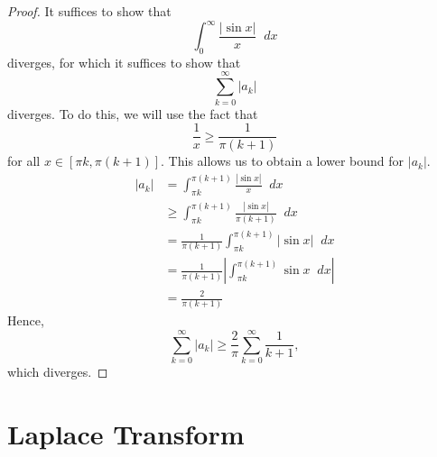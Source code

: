 \documentclass[a4paper]{article}
\newcommand*\diff{\mathop{}\!d} %
\theoremstyle{definition}
\begin{document}
\begin{proof}
    It suffices to show that
    \begin{equation*}
        \int_{0}^{\infty} \frac{|\sin x|}{x} \diff x
    \end{equation*}
    diverges, for which it suffices to show that
    \begin{equation*}
        \sum_{k=0}^{\infty} |a_k|
    \end{equation*}
    diverges.
    To do this, we will use the fact that
    \begin{equation*}
        \frac{1}{x} \geq \frac{1}{\pi(k+1)}
    \end{equation*}
    for all $x \in [\pi k, \pi(k+1)]$.
    This allows us to obtain a lower bound for $|a_k|$.
    \begin{align*}
        |a_k| & = \int_{\pi k}^{\pi(k+1)} \frac{|\sin x|}{x} \diff x                       \\
              & \geq \int_{\pi k}^{\pi(k+1)} \frac{|\sin x|}{\pi(k+1)} \diff x             \\
              & = \frac{1}{\pi(k+1)} \int_{\pi k}^{\pi(k+1)} |\sin x| \diff x              \\
              & = \frac{1}{\pi(k+1)} \left| \int_{\pi k}^{\pi(k+1)} \sin x \diff x \right| \\
              & = \frac{2}{\pi(k+1)}
    \end{align*}
    Hence,
    \begin{equation*}
        \sum_{k=0}^{\infty} |a_k| \geq \frac{2}{\pi} \sum_{k=0}^{\infty} \frac{1}{k+1},
    \end{equation*}
    which diverges.
\end{proof}

\section{Laplace Transform}
\end{document}
